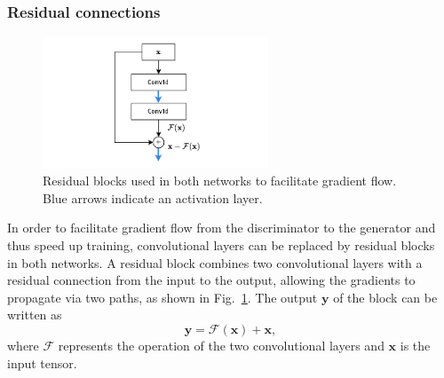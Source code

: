



\subsubsection{Residual connections}
\begin{figure}
    \centering
    \includegraphics[width=0.6\textwidth]{chapter4/residual_sel.drawio.pdf}
    \caption{Residual blocks used in both networks to facilitate gradient flow. Blue arrows indicate an activation layer.}
    \label{fig:residual_block}
\end{figure}
In order to facilitate gradient flow from the discriminator to the generator and thus speed up training, convolutional layers can be replaced by residual blocks~\cite{he2016deep} in both networks. A residual block combines two convolutional layers with a residual connection from the input to the output, allowing the gradients to propagate via two paths, as shown in Fig.~\ref{fig:residual_block}. The output $\mathbf{y}$ of the block can be written as
\begin{equation*}
    \mathbf{y} = \mathcal{F}(\mathbf{x}) + \mathbf{x},
\end{equation*}
where $\mathcal{F}$ represents the operation of the two convolutional layers and $\mathbf{x}$ is the input tensor. %


